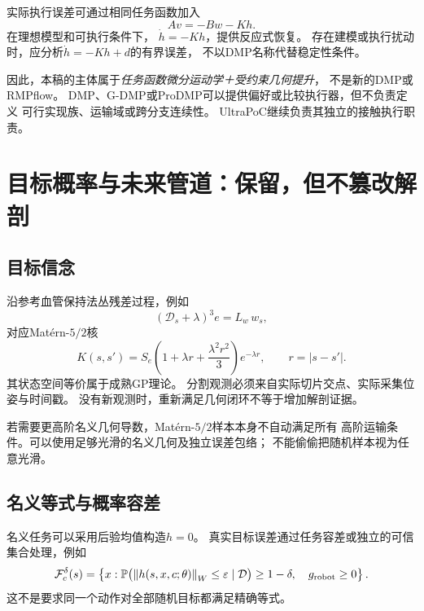 \documentclass[UTF8,11pt,a4paper,fontset=fandol]{ctexart}
\numberwithin{equation}{section}
\theoremstyle{definition}
\newcommand{\norm}[1]{\left\lVert#1\right\rVert}
\begin{document}
实际执行误差可通过相同任务函数加入
\begin{equation}
 Av=-Bw-Kh.
\end{equation}
在理想模型和可执行条件下，
$\dot h=-Kh$，提供反应式恢复。
存在建模或执行扰动时，应分析$\dot h=-Kh+d$的有界误差，
不以DMP名称代替稳定性条件。

因此，本稿的主体属于\emph{任务函数微分运动学＋受约束几何提升}，
不是新的DMP或RMPflow。
DMP、G-DMP或ProDMP可以提供偏好或比较执行器，但不负责定义
可行实现族、运输域或跨分支连续性。
UltraPoC继续负责其独立的接触执行职责。

\section{目标概率与未来管道：保留，但不篡改解剖}

\subsection{目标信念}

沿参考血管保持法丛残差过程，例如
\begin{equation}
 (\mathcal D_s+\lambda)^3e=L_w\,w_s,
\end{equation}
对应Matérn-$5/2$核
\begin{equation}
 K(s,s')=
 S_e\left(1+\lambda r+\frac{\lambda^2r^2}{3}\right)e^{-\lambda r},
 \qquad r=|s-s'|.
\end{equation}
其状态空间等价属于成熟GP理论\cite{hartikainen}。
分割观测必须来自实际切片交点、实际采集位姿与时间戳。
没有新观测时，重新满足几何闭环不等于增加解剖证据。

若需要更高阶名义几何导数，Matérn-$5/2$样本本身不自动满足所有
高阶运输条件。可以使用足够光滑的名义几何及独立误差包络；
不能偷偷把随机样本视为任意光滑。

\subsection{名义等式与概率容差}

名义任务可以采用后验均值构造$h=0$。
真实目标误差通过任务容差或独立的可信集合处理，例如
\begin{equation}
 \mathcal F_c^\delta(s)=
 \left\{
 x:
 \mathbb P\bigl(
 \norm{h(s,x,c;\theta)}_W\leq\varepsilon
 \mid\mathcal D
 \bigr)\geq1-\delta,\quad
 g_{\rm robot}\geq0
 \right\}.
\end{equation}
这不是要求同一个动作对全部随机目标都满足精确等式。
\end{document}
